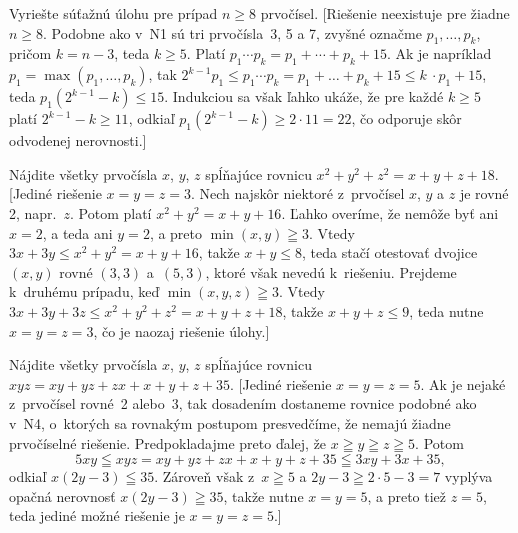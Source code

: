 {Vyriešte súťažnú úlohu pre prípad $n\ge8$ prvočísel.
[Riešenie neexistuje pre žiadne $n\ge8$.
Podobne ako v~N1 sú tri prvočísla~3, 5 a 7, zvyšné
označme $p_1,\ldots,p_k$, pričom $k=n-3$, teda $k \ge 5$.
Platí $p_1 \cdots p_k = p_1+\cdots+p_k+15$. Ak je napríklad
$p_1=\max(p_1,\ldots,p_k)$, tak
$2^{k-1}p_1 \leq p_1 \cdots p_k = p_1+\ldots+p_k+15 \leq k~\cdot p_1+15$,
teda
${p_1(2^{k-1}-k)} \leq 15$. Indukciou sa však ľahko ukáže, že pre
každé $k \ge 5$ platí ${2^{k-1}-k} \ge 11$, odkiaľ
${p_1(2^{k-1}-k)} \ge 2 \cdot 11 = 22$, čo odporuje skôr odvodenej
nerovnosti.]

Nájdite všetky prvočísla $x$, $y$, $z$ spĺňajúce rovnicu
${x^2+y^2+z^2 =x+y+z+18}$.
[Jediné riešenie $x=y=z=3$. Nech najskôr niektoré z~prvočísel
$x$, $y$ a $z$ je rovné 2, napr.~$z$. Potom platí $x^2+y^2=x+y+16$.
Ľahko overíme, že nemôže byť ani $x=2$, a teda ani $y=2$,
a preto $\min(x,y)\geqq3$. Vtedy $3x+3y \leq x^2+y^2=x+y+16$,
takže $x+y\leq 8$, teda stačí otestovať dvojice $(x,y)$
rovné $(3,3)$ a~$(5,3)$, ktoré však nevedú k~riešeniu.
Prejdeme k~druhému prípadu, keď $\min(x,y,z)\geqq3$. Vtedy
$3x+3y+3z \leq x^2+y^2+z^2=x+y+z+18$, takže $x+y+z \leq 9$,
teda nutne $x=y=z=3$, čo je naozaj riešenie úlohy.]

Nájdite všetky prvočísla $x$, $y$, $z$ spĺňajúce rovnicu $xyz=xy+yz+zx+x+y+z+35$.
[Jediné riešenie $x=y=z=5$. Ak je nejaké z~prvočísel rovné~2 alebo~3,
tak dosadením dostaneme rovnice podobné ako v~N4,
o~ktorých sa rovnakým postupom presvedčíme, že nemajú žiadne
prvočíselné riešenie. Predpokladajme preto ďalej, že
$x\geqq y\geqq z\geqq 5$. Potom
$$
5xy\leqq xyz=xy+yz+zx+x+y+z+35\leqq 3xy+3x+35,
$$
odkiaľ $x(2y-3)\leqq35$. Zároveň však z~$x\geqq5$ a
$2y-3\geqq2\cdot5-3=7$ vyplýva opačná nerovnosť $x(2y-3)\geqq35$,
takže nutne $x=y=5$, a preto tiež $z=5$, teda
jediné možné riešenie je $x=y=z=5$.]
}

